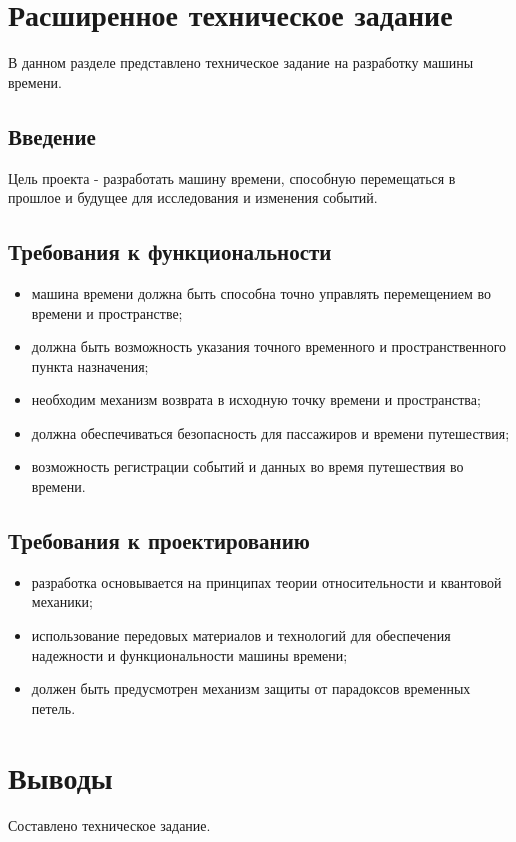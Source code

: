 \newpage

\section{Расширенное техническое задание}

В данном разделе представлено техническое задание на разработку машины времени.


\subsection{Введение}
Цель проекта - разработать машину времени, способную перемещаться в прошлое и будущее для исследования и изменения событий.

\subsection{Требования к функциональности}
\begin{itemize}
	\item машина времени должна быть способна точно управлять перемещением во времени и пространстве;
	\item должна быть возможность указания точного временного и пространственного пункта назначения;
	\item необходим механизм возврата в исходную точку времени и пространства;
	\item должна обеспечиваться безопасность для пассажиров и времени путешествия;
	\item возможность регистрации событий и данных во время путешествия во времени.
\end{itemize}

\subsection{Требования к проектированию}

\begin{itemize}
	\item разработка основывается на принципах теории относительности и квантовой механики;
	\item использование передовых материалов и технологий для обеспечения надежности и функциональности машины времени;
	\item должен быть предусмотрен механизм защиты от парадоксов временных петель.
\end{itemize}

\section*{Выводы}

Составлено техническое задание.
